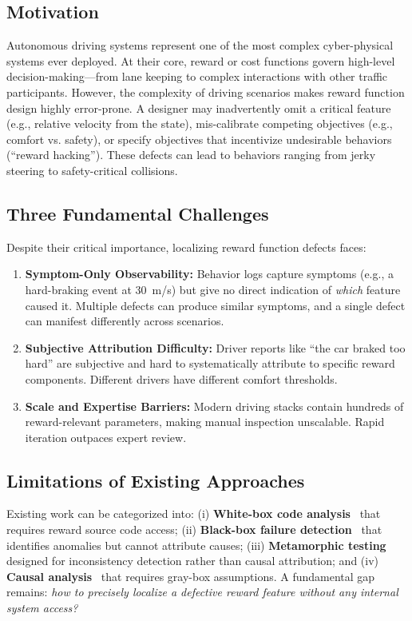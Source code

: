 \documentclass[conference]{IEEEtran}
\theoremstyle{plain}
\begin{document}
\subsection{Motivation}

Autonomous driving systems represent one of the most complex cyber-physical systems ever deployed. At their core, reward or cost functions govern high-level decision-making---from lane keeping to complex interactions with other traffic participants. However, the complexity of driving scenarios makes reward function design highly error-prone. A designer may inadvertently omit a critical feature (e.g., relative velocity from the state), mis-calibrate competing objectives (e.g., comfort vs. safety), or specify objectives that incentivize undesirable behaviors (``reward hacking''). These defects can lead to behaviors ranging from jerky steering to safety-critical collisions.

\subsection{Three Fundamental Challenges}

Despite their critical importance, localizing reward function defects faces:

\begin{enumerate}[nosep]
    \item \textbf{Symptom-Only Observability:} Behavior logs capture symptoms (e.g., a hard-braking event at 30~m/s) but give no direct indication of \emph{which} feature caused it. Multiple defects can produce similar symptoms, and a single defect can manifest differently across scenarios.
    \item \textbf{Subjective Attribution Difficulty:} Driver reports like ``the car braked too hard'' are subjective and hard to systematically attribute to specific reward components. Different drivers have different comfort thresholds.
    \item \textbf{Scale and Expertise Barriers:} Modern driving stacks contain hundreds of reward-relevant parameters, making manual inspection unscalable. Rapid iteration outpaces expert review.
\end{enumerate}

\subsection{Limitations of Existing Approaches}

Existing work can be categorized into: (i) \textbf{White-box code analysis}~\cite{knox2023reward} that requires reward source code access; (ii) \textbf{Black-box failure detection}~\cite{remav2024} that identifies anomalies but cannot attribute causes; (iii) \textbf{Metamorphic testing}~\cite{deng2023rmt} designed for inconsistency detection rather than causal attribution; and (iv) \textbf{Causal analysis}~\cite{wan2024dvca} that requires gray-box assumptions. A fundamental gap remains: \emph{how to precisely localize a defective reward feature without any internal system access?}
\end{document}
